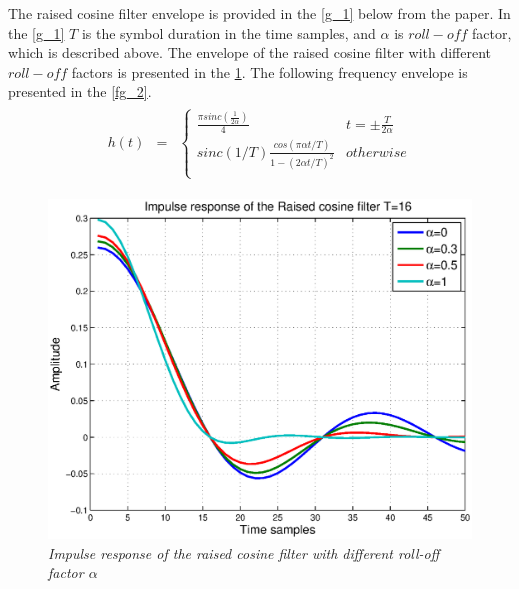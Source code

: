  The raised cosine filter envelope is provided in the \eqref{g_1} below from the \cite{Book5} paper. In the \eqref{g_1} $T$ is the symbol duration in the time samples, and $\alpha$ is $roll-off$ factor, which is described above\cite{Book33}. The envelope of the raised cosine filter with different $roll-off$ factors is presented in the \ref{fg_1}. The following frequency envelope is presented in the \ref{fg_2}.
\begin{align}
\begin{matrix}
h(t)&=&\left\{
\begin{matrix}
\frac{\pi sinc(\frac{1}{2\alpha})}{4}& t=\pm \frac{T}{2\alpha}\\
sinc(1/T)\frac{cos(\pi \alpha t/T)}{1-(2 \alpha t /T)^2}&otherwise\\
\end{matrix} \right.
\end{matrix}
\label{g_1}
\end{align}
\begin{figure}[H]
\centering
\includegraphics[width=0.9\columnwidth]{RC_time.eps}
\caption{\textit{Impulse response of the raised cosine filter with different roll-off factor $\alpha$}}
\label{fg_1}
\end{figure}
